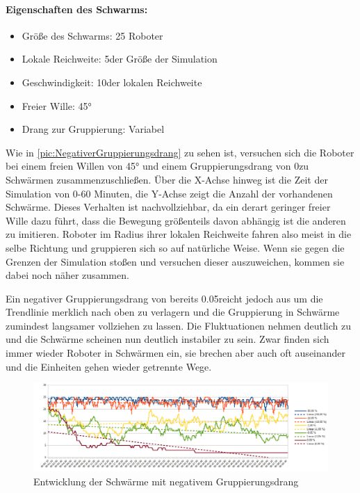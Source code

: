 \paragraph*{Eigenschaften des Schwarms:}
\begin{itemize}
	\item Größe des Schwarms: 25 Roboter
	\item Lokale Reichweite: 5\per der Größe der Simulation
	\item Geschwindigkeit: 10\per der lokalen Reichweite
	\item Freier Wille: 45°
	\item Drang zur Gruppierung: Variabel
\end{itemize}

Wie in \autoref{pic:NegativerGruppierungsdrang} zu sehen ist, versuchen sich die Roboter bei einem  freien Willen von 45° und einem Gruppierungsdrang von 0\per zu Schwärmen zusammenzuschließen. Über die X-Achse hinweg ist die Zeit der Simulation von 0-60 Minuten, die Y-Achse zeigt die Anzahl der vorhandenen Schwärme. Dieses Verhalten ist nachvollziehbar, da ein derart geringer freier Wille dazu führt, dass die Bewegung größenteils davon abhängig ist die anderen zu imitieren. Roboter im Radius ihrer lokalen Reichweite fahren also meist in die selbe Richtung und gruppieren sich so auf natürliche Weise. Wenn sie gegen die Grenzen der Simulation stoßen und versuchen dieser auszuweichen, kommen sie dabei noch näher zusammen.

Ein negativer Gruppierungsdrang von bereits 0.05\per reicht jedoch aus um die Trendlinie merklich nach oben zu verlagern und die Gruppierung in Schwärme zumindest langsamer vollziehen zu lassen. Die Fluktuationen nehmen deutlich zu und die Schwärme scheinen nun deutlich instabiler zu sein. Zwar finden sich immer wieder Roboter in Schwärmen ein, sie brechen aber auch oft auseinander und die Einheiten gehen wieder getrennte Wege.

\begin{figure}
	\includegraphics[width=\textwidth, height=\statisticHeight]{graphics/Statistics/FlockGeneral/LocalRange1Speed01FreeWill45NegativeToFlock.png}
	\caption{Entwicklung der Schwärme mit negativem Gruppierungsdrang}
	\label{pic:NegativerGruppierungsdrang}
\end{figure}

